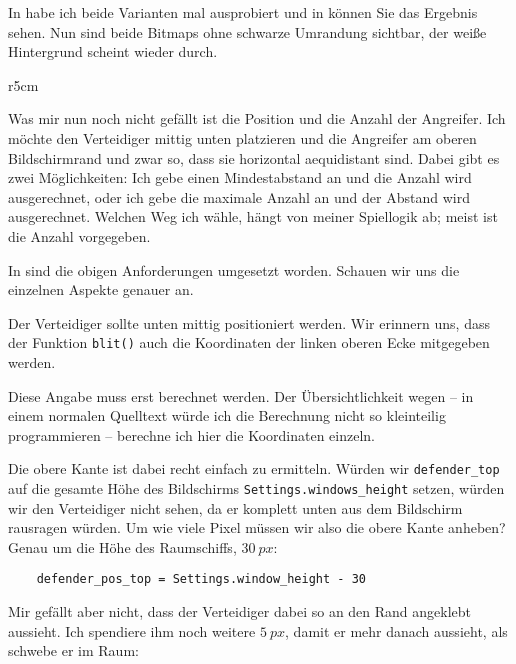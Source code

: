 In  habe ich beide Varianten mal ausprobiert und in  können Sie das Ergebnis sehen. Nun sind beide Bitmaps ohne schwarze Umrandung sichtbar, der weiße Hintergrund scheint wieder durch.

\begin{wrapfigure}[8]{r}{5cm}
\end{wrapfigure}Was mir nun noch nicht gefällt ist die Position und die Anzahl der Angreifer. Ich möchte den Verteidiger mittig unten platzieren und die Angreifer am oberen Bildschirmrand und zwar so, dass sie horizontal  \gls{aequidistant} sind. Dabei gibt es zwei Möglichkeiten: Ich gebe einen Mindestabstand an und die Anzahl wird ausgerechnet, oder ich gebe die maximale Anzahl an und der Abstand wird ausgerechnet. Welchen Weg ich wähle, hängt von meiner Spiellogik ab; meist ist die Anzahl vorgegeben.


In  sind die obigen Anforderungen umgesetzt worden. Schauen wir uns die einzelnen Aspekte genauer an.

Der Verteidiger sollte unten mittig positioniert werden. Wir erinnern uns, dass der Funktion \texttt{blit()} auch die Koordinaten der linken oberen Ecke mitgegeben werden. 

Diese Angabe muss erst berechnet werden. Der Übersichtlichkeit wegen -- in einem normalen Quelltext würde ich die Berechnung nicht so kleinteilig programmieren -- berechne ich hier die Koordinaten einzeln.

Die obere Kante ist dabei recht einfach zu ermitteln. Würden wir \texttt{defender\_top} auf die gesamte Höhe des Bildschirms \texttt{Settings.windows\_height} setzen, würden wir den Verteidiger nicht sehen, da er komplett unten aus dem Bildschirm rausragen würden. Um wie viele Pixel müssen wir also die obere Kante anheben? Genau um die Höhe des Raumschiffs, $30~px$:

\lstset{firstnumber=24}
\begin{lstlisting}
	defender_pos_top = Settings.window_height - 30
\end{lstlisting}

Mir gefällt aber nicht, dass der Verteidiger dabei so an den Rand angeklebt aussieht. Ich spendiere ihm noch weitere $5~px$, damit er mehr danach aussieht, als schwebe er im Raum:

